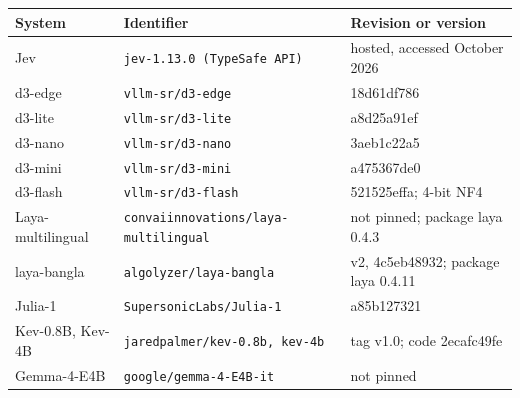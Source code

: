 \begin{tabular}{@{}lll@{}}\toprule
System & Identifier & Revision or version \\\midrule
Jev & \texttt{jev-1.13.0 (TypeSafe API)} & hosted, accessed October 2026 \\
d3-edge & \texttt{vllm-sr/d3-edge} & 18d61df786 \\
d3-lite & \texttt{vllm-sr/d3-lite} & a8d25a91ef \\
d3-nano & \texttt{vllm-sr/d3-nano} & 3aeb1c22a5 \\
d3-mini & \texttt{vllm-sr/d3-mini} & a475367de0 \\
d3-flash & \texttt{vllm-sr/d3-flash} & 521525effa; 4-bit NF4 \\
Laya-multilingual & \texttt{convaiinnovations/laya-multilingual} & not pinned; package laya 0.4.3 \\
laya-bangla & \texttt{algolyzer/laya-bangla} & v2, 4c5eb48932; package laya 0.4.11 \\
Julia-1 & \texttt{SupersonicLabs/Julia-1} & a85b127321 \\
Kev-0.8B, Kev-4B & \texttt{jaredpalmer/kev-0.8b, kev-4b} & tag v1.0; code 2ecafc49fe \\
Gemma-4-E4B & \texttt{google/gemma-4-E4B-it} & not pinned \\
\bottomrule\end{tabular}
